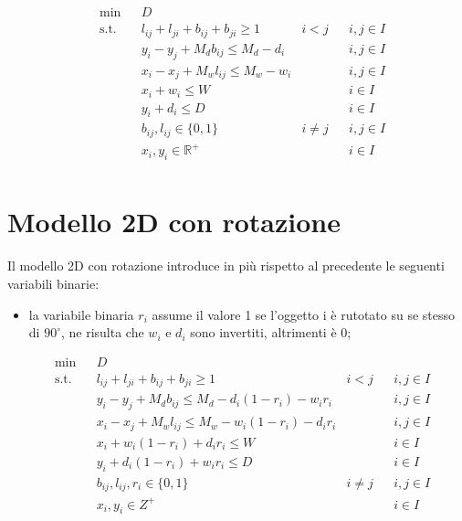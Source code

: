\begin{equation*}
    \begin{aligned}
    & \underset{}{\text{min}}
    & & D \\
    & \text{s.t.} & &  l_{ij} + l_{ji} + b_{ij} + b_{ji} \geq 1 & i < j & & i,j \in I \\
    & & & y_i - y_j + M_d b_{ij} \leq M_d - d_i & & & i,j \in I \\
    & & & x_i - x_j + M_w l_{ij} \leq M_w - w_i & & & i,j \in I \\
    & & & x_i + w_i \leq W & & & i \in I \\
    & & & y_i + d_i \leq D & & & i \in I \\
    & & & b_{ij}, l_{ij} \in \{0,1\} & i \neq j & & i,j \in I \\
    & & & x_{i}, y_{i} \in \mathbb{R}^{+} & & & i \in I \\
    \end{aligned}
\end{equation*}

\newpage

\section{Modello 2D con rotazione}
Il modello 2D con rotazione introduce in più rispetto al precedente le seguenti variabili binarie:
\begin{itemize}
    \item la variabile binaria $r_{i}$ assume il valore 1 se l'oggetto i è rutotato su se stesso di $90^{\circ}$, ne risulta che $w_{i}$ e $d_{i}$ sono invertiti, altrimenti è 0;
\end{itemize}

\begin{equation*}
    \begin{aligned}
    & \underset{}{\text{min}}
    & & D \\
    & \text{s.t.} & &  l_{ij} + l_{ji} + b_{ij} + b_{ji} \geq 1 & i < j & & i,j \in I \\
    & & & y_i - y_j + M_d b_{ij} \leq M_d - d_i (1 - r_i) - w_i r_i & & & i,j \in I \\
    & & & x_i - x_j + M_w l_{ij} \leq M_w - w_i (1 - r_i) - d_i r_i & & & i,j \in I \\
    & & & x_i + w_i (1 - r_i) + d_i r_i \leq W & & & i \in I \\
    & & & y_i + d_i (1 - r_i) + w_i r_i \leq D & & & i \in I \\
    & & & b_{ij}, l_{ij}, r_i \in \{0,1\} & i \neq j & & i,j \in I \\
    & & & x_{i}, y_{i} \in Z^{+} & & & i \in I \\
    \end{aligned}
\end{equation*}

